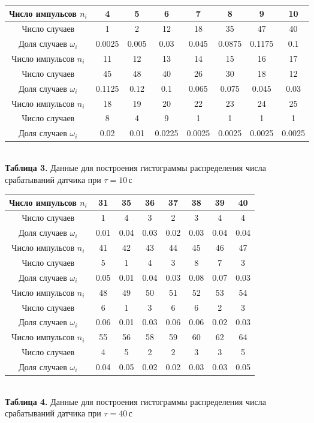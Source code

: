\documentclass[12pt,a4paper]{scrartcl}
\begin{document}
	\begin{center}
		\begin{tabular}{|c|c|c|c|c|c|c|c|}
			\hline Число импульсов $n_i$ & 4 & 5 & 6 & 7 & 8 & 9 & 10 
			\\\hline Число случаев & 1 & 2 & 12 & 18 & 35 & 47 & 40 
			\\\hline Доля случаев  $\omega_i$ & 0.0025 & 0.005 & 0.03 & 0.045 & 0.0875 & 0.1175 & 0.1
			\\\hline Число импульсов $n_i$ & 11 & 12 & 13 & 14 & 15 & 16 & 17
			\\\hline Число случаев & 45 & 48 & 40 & 26 & 30 & 18 & 12
			\\\hline Доля случаев  $\omega_i$ & 0.1125 & 0.12 & 0.1 & 0.065 & 0.075 & 0.045 & 0.03
			\\\hline Число импульсов $n_i$ & 18 & 19 & 20 & 22 & 23 & 24 & 25
			\\\hline Число случаев & 8 & 4 & 9 & 1 & 1 & 1 & 1
			\\\hline Доля случаев  $\omega_i$ & 0.02 & 0.01 & 0.0225 & 0.0025 & 0.0025 & 0.0025 & 0.0025
			\\\hline
		\end{tabular}
		\\\textbf{Таблица 3.} Данные для построения гистограммы распределения числа 
		\\срабатываний датчика при $\tau = 10\,$с
	\end{center}
	\begin{center}
		\begin{tabular}{|c|c|c|c|c|c|c|c|}
			\hline Число импульсов $n_i$ & 31 & 35 & 36 & 37 & 38 & 39 & 40 
			\\\hline Число случаев & 1 & 4 & 3 & 2 & 3 & 4 & 4 
			\\\hline Доля случаев  $\omega_i$ & 0.01 & 0.04 & 0.03 & 0.02 & 0.03 & 0.04 & 0.04
			\\\hline Число импульсов $n_i$ & 41 & 42 & 43 & 44 & 45 & 46 & 47
			\\\hline Число случаев & 5 & 1 & 4 & 3 & 8 & 7 & 3
			\\\hline Доля случаев  $\omega_i$ & 0.05 & 0.01 & 0.04 & 0.03 & 0.08 & 0.07 & 0.03
			\\\hline Число импульсов $n_i$ & 48 & 49 & 50 & 51 & 52 & 53 & 54
			\\\hline Число случаев & 6 & 1 & 3 & 6 & 6 & 2 & 3
			\\\hline Доля случаев  $\omega_i$ & 0.06 & 0.01 & 0.03 & 0.06 & 0.06 & 0.02 & 0.03
			\\\hline Число импульсов $n_i$ & 55 & 56 & 58 & 59 & 60 & 62 & 64
			\\\hline Число случаев & 4 & 5 & 2 & 2 & 3 & 3 & 5
			\\\hline Доля случаев  $\omega_i$ & 0.04 & 0.05 & 0.02 & 0.02 & 0.03 & 0.03 & 0.05
			\\\hline
		\end{tabular}
		\\\textbf{Таблица 4.} Данные для построения гистограммы распределения числа 
		\\срабатываний датчика при $\tau = 40\,$с
	\end{center}
\end{document}
